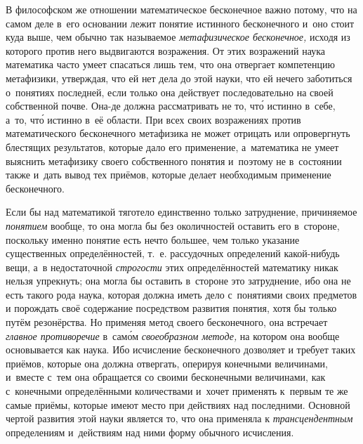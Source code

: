 В философском же отношении математическое бесконечное важно потому, что на
самом деле в~его основании лежит понятие истинного бесконечного и~оно стоит
куда выше, чем обычно так называемое {\em метафизическое бесконечное,} исходя
из которого против него выдвигаются возражения. От этих возражений наука
математика часто умеет спасаться лишь тем, что она отвергает компетенцию
метафизики, утверждая, что ей нет дела до этой науки, что ей нечего
заботиться о~понятиях последней, если только она действует последовательно
на своей собственной почве. Она-де должна рассматривать не то, чт\'{о}
истинно в~себе, а~то, чт\'{о} истинно в~её области. При
всех своих возражениях против математического бесконечного метафизика не
может отрицать или опровергнуть блестящих результатов, которые дало его
применение, а~математика не умеет выяснить метафизику своего собственного
понятия и~поэтому не в~состоянии также и~дать вывод тех приёмов, которые
делает необходимым применение бесконечного.

Если бы над математикой тяготело единственно только затруднение, причиняемое
{\em понятием} вообще, то она могла бы без околичностей оставить его в~стороне,
поскольку именно понятие есть нечто большее, чем только указание существенных
определённостей, т.~е. рассудочных определений какой-нибудь вещи, а~в
недостаточной {\em строгости} этих определённостей математику никак нельзя
упрекнуть; она могла бы оставить в~стороне это затруднение, ибо она не есть
такого рода наука, которая должна иметь дело с~понятиями своих предметов и
порождать своё содержание посредством развития понятия, хотя бы только путём
резонёрства. Но применяя метод своего бесконечного, она
встречает {\em главное противоречие} в~сам\'{о}м {\em своеобразном методе,} на
котором она вообще основывается как наука. Ибо исчисление бесконечного дозволяет и
требует таких приёмов, которые она должна отвергать, оперируя конечными
величинами, и~вместе с~тем она обращается со своими бесконечными величинами,
как с~конечными определёнными количествами и~хочет применять к~первым те же
самые приёмы, которые имеют место при действиях над последними. Основной чертой
развития этой науки является то, что она применяла к {\em трансцендентным}
определениям и~действиям над ними форму обычного исчисления.

